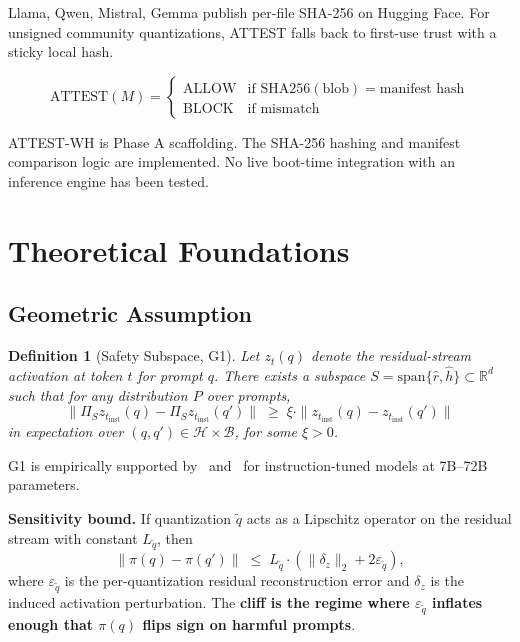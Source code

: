 \documentclass[11pt,a4paper]{article}
\newtheorem{definition}{Definition}
\newcommand{\rhat}{\hat{r}}
\newcommand{\hhat}{\hat{h}}
\begin{document}
Llama, Qwen, Mistral, Gemma publish per-file SHA-256 on Hugging Face.
For unsigned community quantizations, ATTEST falls back to first-use trust with
a sticky local hash.

\begin{equation}
  \text{ATTEST}(M) =
  \begin{cases}
    \text{ALLOW}    & \text{if } \mathrm{SHA256}(\text{blob}) = \text{manifest hash} \\
    \text{BLOCK}    & \text{if mismatch}
  \end{cases}
\end{equation}

\begin{scaffoldbox}
ATTEST-WH is Phase A scaffolding. The SHA-256 hashing and manifest comparison logic
are implemented. No live boot-time integration with an inference engine has been tested.
\end{scaffoldbox}

\section{Theoretical Foundations}
\label{sec:theory}

\subsection{Geometric Assumption}

\begin{definition}[Safety Subspace, G1]
Let $z_t(q)$ denote the residual-stream activation at token $t$ for prompt $q$.
There exists a subspace $S = \mathrm{span}\{\rhat, \hhat\} \subset \mathbb{R}^d$
such that for any distribution $P$ over prompts,
\[
\|\Pi_S z_{t_\text{inst}}(q) - \Pi_S z_{t_\text{inst}}(q')\|
\;\ge\; \xi \cdot \|z_{t_\text{inst}}(q) - z_{t_\text{inst}}(q')\|
\]
in expectation over $(q, q') \in \mathcal{H} \times \mathcal{B}$, for some $\xi > 0$.
\end{definition}

G1 is empirically supported by~\citet{arditi2024refusal} and~\citet{zhao2025refusal}
for instruction-tuned models at 7B--72B parameters.

\textbf{Sensitivity bound.}
If quantization $\tilde q$ acts as a Lipschitz operator on the residual stream with
constant $L_{\tilde q}$, then
\begin{equation}
  \|\pi(q) - \pi(q')\| \;\le\; L_{\tilde q} \cdot (\|\delta_z\|_2 + 2\varepsilon_{\tilde q}),
  \label{eq:sensitivity}
\end{equation}
where $\varepsilon_{\tilde q}$ is the per-quantization residual reconstruction error
and $\delta_z$ is the induced activation perturbation.
The \textbf{cliff is the regime where $\varepsilon_{\tilde q}$ inflates enough that
$\pi(q)$ flips sign on harmful prompts}.
\end{document}

